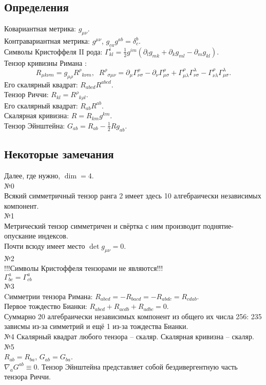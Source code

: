 \documentclass[a4paper, 10pt]{article}
\begin{document}
	\subsection{Определения}
	Ковариантная метрика: $g_{\mu\nu}$.\\
	Контравариантная метрика: $g^{\mu\nu}$, $g_{ca}g^{ab} = \delta^b_c$.\\
	Символы Кристоффеля II рода: $\Gamma^i_{kl} = \frac{1}{2}g^{im}\left( \partial_l g_{mk} + \partial_k g_{ml} - \partial_m g_{kl} \right)$.\\
	Тензор кривизны Римана : 
	$$R_{\mu k \nu m} = g_{\mu\rho} {R^\rho}_{k \nu m}, \;\; {R^\rho}_{\sigma\mu\nu} = \partial_{\mu}\Gamma^\rho_{\nu\sigma} - \partial_{\nu}\Gamma^\rho_{\mu\sigma} + \Gamma^\rho_{\mu\lambda}\Gamma^{\lambda}_{\nu\sigma} - \Gamma^\rho_{\nu\lambda}\Gamma^\lambda_{\mu\sigma}.$$
	Его скалярный квадрат: $R_{abcd}R^{abcd}$.\\
	Тензор Риччи: $R_{kl} = {R^\rho}_{k \rho l}$.\\
	Его скалярный квадрат: $R_{ab}R^{ab}$.\\
	Скалярная кривизна: $R = R_{km}g^{km}$.\\
	Тензор Эйнштейна: $G_{ab} = R_{ab} - \frac{1}{2}Rg_{ab}$.
	\subsection{Некоторые замечания}
	Далее, где нужно, $\operatorname{dim} = 4$.\\
	№0\\
	Всякий симметричный тензор ранга 2 имеет здесь 10 алгебраически независимых компонент.\\
	№1\\
	Метрический тензор симметричен и свёртка с ним производит поднятие-опускание индексов.\\
	Почти всюду имеет место $\det g_{\mu\nu}= 0$.\\
	№2\\
	!!!Символы Кристоффеля тензорами не являются!!!\\
	$\Gamma^a_{bc} = \Gamma^a_{cb}$\\
	№3\\
	Cимметрии тензора Римана: $R_{abcd}=-R_{bacd}=-R_{abdc}=R_{cdab}$.\\
	Первое тождество Бианки: $R_{abcd}+R_{acdb}+R_{adbc}=0$.\\
	Суммарно 20 алгебраически независимых компонент из общего их числа 256: 235 зависмы из-за симметрий и ещё 1 из-за тождества Бианки.\\
	№4
	Скалярный квадрат любого тензора -- скаляр. Скалярная кривизна -- скаляр.\\
	№5\\
	$R_{ab} = R_{ba}$, 	$G_{ab} = G_{ba}$.\\
	$\nabla_a G^{ab} \equiv 0$. Тензор Эйнштейна представляет собой бездивергентную часть тензора Риччи.
\end{document}

